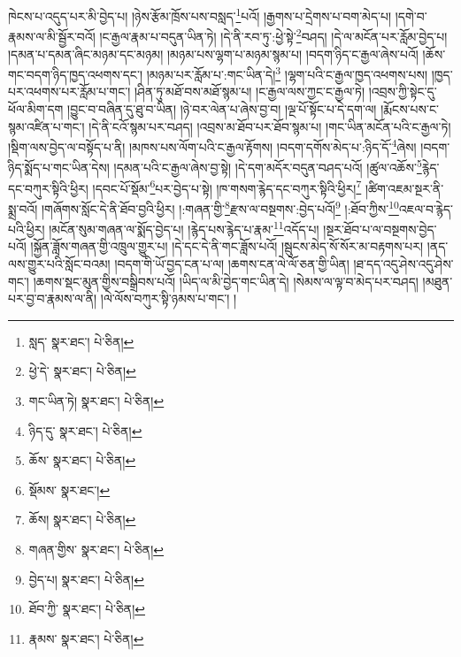 ཁེངས་པ་འདུད་པར་མི་བྱེད་པ། །ཉེས་རྩོམ་ཁྲོས་པས་བསླད་\footnote{སླད་  སྣར་ཐང་།  པེ་ཅིན། }པའོ། །རྒྱགས་པ་དྲེགས་པ་བག་མེད་པ། །དགེ་བ་རྣམས་ལ་མི་སྦྱོར་བའོ། །ང་རྒྱལ་རྣམ་པ་བདུན་ཡིན་ཏེ། །དེ་ནི་རབ་ཏུ་:ཕྱེ་སྟེ་\footnote{ཕྱེ་དེ་  སྣར་ཐང་།  པེ་ཅིན། }བཤད། །དེ་ལ་མངོན་པར་རློམ་བྱེད་པ། །དམན་པ་དམན་ཞིང་མཉམ་དང་མཉམ། །མཉམ་པས་ལྷག་པ་མཉམ་སྙམ་པ། །བདག་ཉིད་ང་རྒྱལ་ཞེས་པའོ། །ཆོས་གང་བདག་ཉིད་ཁྱད་འཕགས་དང་། །མཉམ་པར་རློམ་པ་:གང་ཡིན་དེ།\footnote{གང་ཡིན་ཏེ།  སྣར་ཐང་།  པེ་ཅིན། } །ལྷག་པའི་ང་རྒྱལ་ཁྱད་འཕགས་པས། །ཁྱད་པར་འཕགས་པར་རློམ་པ་གང་། །ཤིན་ཏུ་མཐོ་བས་མཐོ་སྙམ་པ། །ང་རྒྱལ་ལས་ཀྱང་ང་རྒྱལ་ཏེ། །འབྲས་ཀྱི་སྟེང་དུ་ཕོལ་མིག་དག །བྱུང་བ་བཞིན་དུ་ཐུ་བ་ཡིན། །ཉེ་བར་ལེན་པ་ཞེས་བྱ་བ། །ལྔ་པོ་སྟོང་པ་དེ་དག་ལ། །རྨོངས་པས་ང་སྙམ་འཛིན་པ་གང་། །དེ་ནི་ངའོ་སྙམ་པར་བཤད། །འབྲས་མ་ཐོབ་པར་ཐོབ་སྙམ་པ། །གང་ཡིན་མངོན་པའི་ང་རྒྱལ་ཏེ། །སྡིག་ལས་བྱེད་ལ་བསྟོད་པ་ནི། །མཁས་པས་ལོག་པའི་ང་རྒྱལ་རྟོགས། །བདག་དགོས་མེད་པ་:ཉིད་དོ་\footnote{ཉིད་དུ་  སྣར་ཐང་།  པེ་ཅིན། }ཞེས། །བདག་ཉིད་སྨོད་པ་གང་ཡིན་དེས། །དམན་པའི་ང་རྒྱལ་ཞེས་བྱ་སྟེ། །དེ་དག་མདོར་བདུན་བཤད་པའོ། །ཚུལ་འཆོས་\footnote{ཆོས་  སྣར་ཐང་།  པེ་ཅིན། }རྙེད་དང་བཀུར་སྟིའི་ཕྱིར། །དབང་པོ་སྡོམ་\footnote{སྡོམས་  སྣར་ཐང་། }པར་བྱེད་པ་སྟེ། །ཁ་གསག་རྙེད་དང་བཀུར་སྟིའི་ཕྱིར།\footnote{ཆོས།  སྣར་ཐང་།  པེ་ཅིན། } །ཚིག་འཇམ་སྔར་ནི་སྨྲ་བའོ། །གཞོགས་སློང་དེ་ནི་ཐོབ་བྱའི་ཕྱིར། །:གཞན་གྱི་\footnote{གཞན་གྱིས་  སྣར་ཐང་།  པེ་ཅིན། }རྫས་ལ་བསྔགས་:བྱེད་པའོ།\footnote{བྱེད་པ།  སྣར་ཐང་།  པེ་ཅིན། } །:ཐོབ་ཀྱིས་\footnote{ཐོབ་ཀྱི་  སྣར་ཐང་།  པེ་ཅིན། }འཇལ་བ་རྙེད་པའི་ཕྱིར། །མངོན་སུམ་གཞན་ལ་སྨོད་བྱེད་པ། །རྙེད་པས་རྙེད་པ་རྣམ་\footnote{རྣམས་  སྣར་ཐང་།  པེ་ཅིན། }འདོད་པ། །སྔར་ཐོབ་པ་ལ་བསྔགས་བྱེད་པའོ། །སྐྱོན་ཟློས་གཞན་གྱི་འཁྲུལ་གྱུར་པ། །དེ་དང་དེ་ནི་གང་ཟློས་པའོ། །སྦུངས་མེད་སོ་སོར་མ་བརྟགས་པར། །ནད་ལས་གྱུར་པའི་སློང་བའམ། །བདག་གི་ཡོ་བྱད་ངན་པ་ལ། །ཆགས་ངན་ལེ་ལོ་ཅན་གྱི་ཡིན། །ཐ་དད་འདུ་ཤེས་འདུ་ཤེས་གང་། །ཆགས་སྡང་མུན་གྱིས་བསྒྲིབས་པའོ། །ཡིད་ལ་མི་བྱེད་གང་ཡིན་དེ། །སེམས་ལ་ལྟ་བ་མེད་པར་བཤད། །མཐུན་པར་བྱ་བ་རྣམས་ལ་ནི། །ལེ་ལོས་བཀུར་སྟི་ཉམས་པ་གང་། །
